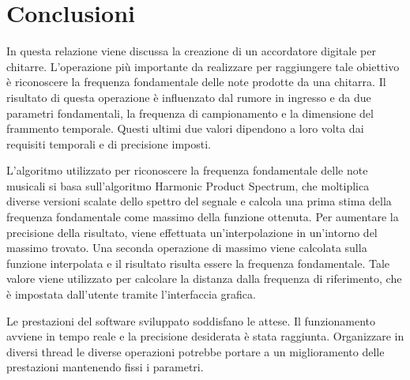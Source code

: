 \chapter{Conclusioni}\label{cap:conclusioni}

In questa relazione viene discussa la creazione di un accordatore digitale per chitarre.
L'operazione più importante da realizzare per raggiungere tale obiettivo è riconoscere la frequenza fondamentale delle note prodotte da una chitarra.
Il risultato di questa operazione è influenzato dal rumore in ingresso e da due parametri fondamentali, la frequenza di campionamento e la dimensione del frammento temporale.
Questi ultimi due valori dipendono a loro volta dai requisiti temporali e di precisione imposti.

L'algoritmo utilizzato per riconoscere la frequenza fondamentale delle note musicali si basa sull'algoritmo Harmonic Product Spectrum, che moltiplica diverse versioni scalate dello spettro del segnale e calcola una prima stima della frequenza fondamentale come massimo della funzione ottenuta.
Per aumentare la precisione della risultato, viene effettuata un'interpolazione in un'intorno del massimo trovato.
Una seconda operazione di massimo viene calcolata sulla funzione interpolata e il risultato risulta essere la frequenza fondamentale.
Tale valore viene utilizzato per calcolare la distanza dalla frequenza di riferimento, che è impostata dall'utente tramite l'interfaccia grafica. 

Le prestazioni del software sviluppato soddisfano le attese.
Il funzionamento avviene in tempo reale e la precisione desiderata è stata raggiunta. 
Organizzare in diversi thread le diverse operazioni potrebbe portare a un miglioramento delle prestazioni mantenendo fissi i parametri.



